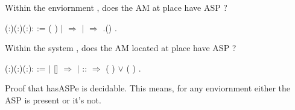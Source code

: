 \documentclass[12pt]{report}
\begin{document}
 Within the enviornment , does the AM at place  have ASP ? 
\begin{coqdoccode}
\coqdocemptyline
\coqdocnoindent
{} (:)(:)(:): :=\coqdoceol
\coqdocnoindent
{} ( ) \coqdoceol
\coqdocnoindent
\ensuremath{|}  \ensuremath{\Rightarrow} \coqdoceol
\coqdocnoindent
\ensuremath{|}   \ensuremath{\Rightarrow}   .()\coqdoceol
\coqdocnoindent
{}.\coqdoceol
\coqdocemptyline
\end{coqdoccode}
Within the system , does the AM located at place  have ASP ? 
\begin{coqdoccode}
\coqdocemptyline
\coqdocnoindent
{} (:)(:)(:): :=\coqdoceol
\coqdocindent{2.00em}
  \coqdoceol
\coqdocindent{2.00em}
\ensuremath{|} [] \ensuremath{\Rightarrow} \coqdoceol
\coqdocindent{2.00em}
\ensuremath{|}  ::  \ensuremath{\Rightarrow} (   ) \ensuremath{\lor} (   )\coqdoceol
\coqdocindent{2.00em}
.\coqdoceol
\coqdocemptyline
\end{coqdoccode}
Proof that hasASPe is decidable. This means, for any enviornment  
   either the ASP  is present or it's not. 
\end{document}
